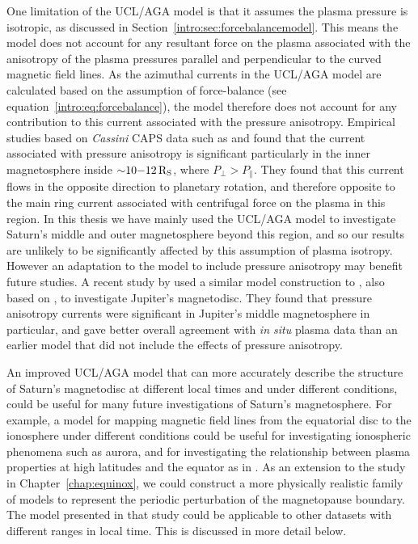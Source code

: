 One limitation of the UCL/AGA model is that it assumes the plasma pressure is isotropic, as discussed in Section~\ref{intro:sec:forcebalancemodel}.  This means the model does not account for any resultant force on the plasma associated with the anisotropy of the plasma pressures parallel and perpendicular to the curved magnetic field lines. As the azimuthal currents in the UCL/AGA model are calculated based on the assumption of force-balance (see equation~\ref{intro:eq:forcebalance}), the model therefore does not account for any contribution to this current associated with the pressure anisotropy. Empirical studies based on \textit{Cassini} CAPS data such as \citet{sergis2010} and \citet{kellett2011} found that the current associated with pressure anisotropy is significant particularly in the inner magnetosphere inside ${\sim}10{\--}\SI{12}{R_S}$, where $P_\perp > P_\parallel$. They found that this current flows in the opposite direction  to planetary rotation, and therefore opposite to the main ring current associated with centrifugal force on the plasma in this region. In this thesis we have mainly  used the UCL/AGA model to investigate Saturn's middle and outer magnetosphere beyond this region, and so our results are unlikely to be significantly affected by this assumption of plasma isotropy. However an adaptation to the model to include pressure anisotropy may benefit future studies. A recent study by \citet{nichols2015} used a similar model construction to \citet{achilleos2010a}, also based on \citet{caudal1986}, to investigate Jupiter's magnetodisc. They found that pressure anisotropy currents were significant in Jupiter's middle magnetosphere in particular, and gave better overall agreement with \textit{in situ} plasma data than an earlier model \citep{nichols2011} that did not include the effects of pressure anisotropy.

An improved UCL/AGA model that can more accurately describe the structure of Saturn's magnetodisc at different local times and under different conditions, could be useful for many future investigations of Saturn's magnetosphere. For example, a model for  mapping magnetic field lines from the equatorial disc to the ionosphere under  different conditions could be useful for investigating ionospheric phenomena such as aurora, and for investigating the relationship between plasma properties at high latitudes and the equator as in \citet{sergis2018}. As an extension to the study  in Chapter~\ref{chap:equinox}, we could construct a  more physically realistic family of models to represent the periodic perturbation of the magnetopause boundary. The model presented in that study could be applicable to other datasets with different ranges in local time. This is discussed in more detail below.

